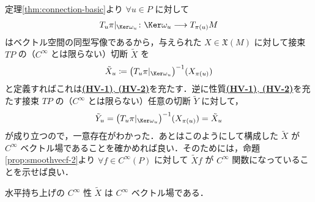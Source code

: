 \documentclass[TQFT_main]{subfiles}
\begin{document}
定理\ref{thm:connection-basic}より $\forall u \in P$ に対して
\begin{align}
    T_u \pi|_{\Ker \omega_u} \colon \Ker \omega_u \lto T_{\pi(u)} M
\end{align}
はベクトル空間の同型写像であるから，与えられた $X \in \mathfrak{X} (M)$ に対して接束 $TP$ の（$C^\infty$ とは限らない）切断 $\tilde{X}$ を
\begin{align}
    \tilde{X}_u \coloneqq \bigl( T_u \pi|_{\Ker \omega_u} \bigr)^{-1} (X_{\pi(u)})
\end{align}
と定義すればこれは\hyperref[def:horizontal-lift-vecf]{\textbf{\textsf{(HV-1)}}, \textsf{\textbf{(HV-2)}}}を充たす．逆に性質\hyperref[def:horizontal-lift-vecf]{\textbf{\textsf{(HV-1)}}, \textsf{\textbf{(HV-2)}}}を充たす接束 $TP$ の（$C^\infty$ とは限らない）任意の切断 $\tilde{Y}$ に対して，
\begin{align}
    \tilde{Y}_u = \bigl( T_u \pi|_{\Ker \omega_u} \bigr)^{-1} (X_{\pi(u)}) = \tilde{X}_u
\end{align}
が成り立つので，一意存在がわかった．あとはこのようにして構成した $\tilde{X}$ が $C^\infty$ ベクトル場であることを確かめれば良い．そのためには，命題\ref{prop:smoothvecf-2}より $\forall f \in C^\infty(P)$ に対して $\tilde{X} f$ が $C^\infty$ 関数になっていることを示せば良い．

\begin{myprop}[]{水平持ち上げの $C^\infty$ 性}
    $\tilde{X}$ は $C^\infty$ ベクトル場である．
\end{myprop}
\end{document}
